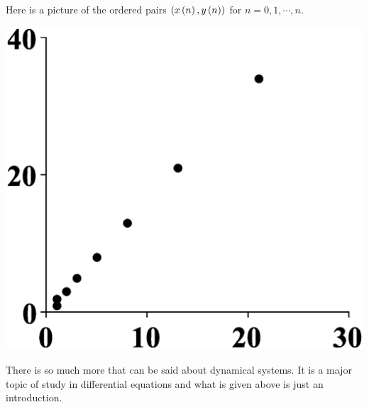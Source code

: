 Here is a picture of
the ordered pairs $\left(x\left(n\right) ,y\left(n\right) \right) $ for $
n=0,1,\cdots ,n$.

\begin{center}
\includegraphics[bb=0 0 800 800,scale=.2]{figures/fibonacci.eps}
\end{center}

There is so much more that can be said about dynamical systems. It is a
major topic of study in differential equations and what is given above is
just an introduction.
